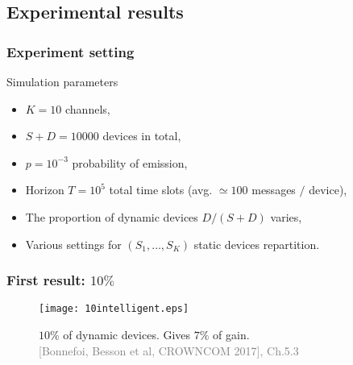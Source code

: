 \subsection{Experimental results}

\subsubsection{Experiment setting}

\begin{frameO}

    \begin{colorblock}{Simulation parameters}

        \begin{itemize}
            \setlength\itemsep{10pt}
            \item
                  \(K = 10\) channels,
            \item
                  \(S + D = 10000\) devices in total,
            \item
                  \(p = 10^{-3}\) probability of emission,
            \item
                  Horizon \(T = 10^5\) total time slots (avg. \(\simeq 100\) messages \(/\)
                  device),
            \item
                  The proportion of dynamic devices \(D/(S+D)\) varies,
            \item
                  Various settings for \((S_1,\dots,S_{K})\) static devices
                  repartition.
        \end{itemize}

    \end{colorblock}

\end{frameO}



\subsubsection{First result: $10\%$}

\begin{frameO}

    \begin{figure}[h!]
        \centering
        \texttt{[image: 10intelligent.eps]}

            $10\%$ of dynamic devices. Gives $7\%$ of gain.\\
            {\tiny \textcolor{gray}{[Bonnefoi, Besson et al, CROWNCOM 2017], Ch.5.3}}
    \end{figure}

\end{frameO}



